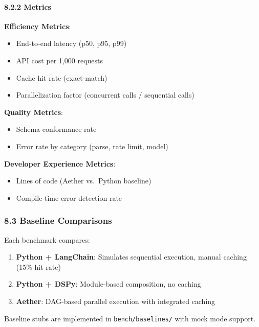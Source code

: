 \documentclass[
]{article}
\newcommand{\passthrough}[1]{#1}
\providecommand{\tightlist}{%
  \setlength{\itemsep}{0pt}\setlength{\parskip}{0pt}}
\begin{document}
\paragraph{8.2.2 Metrics}\label{metrics}

\textbf{Efficiency Metrics}:

\begin{itemize}
\tightlist
\item
  End-to-end latency (p50, p95, p99)
\item
  API cost per 1,000 requests
\item
  Cache hit rate (exact-match)
\item
  Parallelization factor (concurrent calls / sequential calls)
\end{itemize}

\textbf{Quality Metrics}:

\begin{itemize}
\tightlist
\item
  Schema conformance rate
\item
  Error rate by category (parse, rate limit, model)
\end{itemize}

\textbf{Developer Experience Metrics}:

\begin{itemize}
\tightlist
\item
  Lines of code (Aether vs.~Python baseline)
\item
  Compile-time error detection rate
\end{itemize}

\subsubsection{8.3 Baseline Comparisons}\label{baseline-comparisons}

Each benchmark compares:

\begin{enumerate}
\def\labelenumi{\arabic{enumi}.}
\tightlist
\item
  \textbf{Python + LangChain}: Simulates sequential execution, manual
  caching (15\% hit rate)
\item
  \textbf{Python + DSPy}: Module-based composition, no caching
\item
  \textbf{Aether}: DAG-based parallel execution with integrated caching
\end{enumerate}

Baseline stubs are implemented in
\passthrough{\lstinline!bench/baselines/!} with mock mode support.
\end{document}
